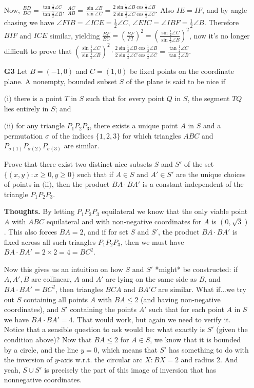 \documentclass[11pt,a4paper]{article}
\begin{document}
\begin{itemize}
Now, $\frac{BD}{DC}=\frac{\tan\frac12\angle C}{\tan\frac12\angle B}$,
$\frac{AC}{AB}=\frac{\sin\angle B}{\sin\angle C}=\frac{2\sin\frac 12\angle B\cos\frac 12\angle B}{2\sin\frac 12\angle C\cos\frac 12\angle C}$.
Also $IE=IF$, and by angle chasing we have $\angle FIB=\angle ICE=\frac12\angle C$,
$\angle EIC=\angle IBF=\frac12\angle B$.
Therefore $BIF$ and $ICE$ similar, yielding $\frac{BF}{EC}=\left(\frac{BF}{FI}\right)^2=\left(\frac{\sin\frac12\angle C}{\sin\frac12\angle B}\right)^2$,
now it's no longer difficult to prove that $\left(\frac{\sin\frac12\angle C}{\sin\frac12\angle B}\right)^2\cdot \frac{2\sin\frac 12\angle B\cos\frac 12\angle B}{2\sin\frac 12\angle C\cos\frac 12\angle C}=\frac{\tan\frac12\angle C}{\tan\frac12\angle B}$.

\newpage

\item[\textbf{G3}]
Let $B = (-1, 0)$ and $C = (1, 0)$ be fixed points on the coordinate plane. A nonempty, bounded subset $S$ of the plane is said to be nice if

$\text{(i)}$ there is a point $T$ in $S$ such that for every point $Q$ in $S$, the segment $TQ$ lies entirely in $S$; and

$\text{(ii)}$ for any triangle $P_1P_2P_3$, there exists a unique point $A$ in $S$ and a permutation $\sigma$ of the indices $\{1, 2, 3\}$ for which triangles $ABC$ and $P_{\sigma(1)}P_{\sigma(2)}P_{\sigma(3)}$ are similar.

Prove that there exist two distinct nice subsets $S$ and $S'$ of the set $\{(x, y) : x \geq 0, y \geq 0\}$ such that if $A \in S$ and $A' \in S'$ are the unique choices of points in $\text{(ii)}$, then the product $BA \cdot BA'$ is a constant independent of the triangle $P_1P_2P_3$.

\textbf{Thoughts.} 
By letting $P_1P_2P_3$ equilateral we know that the only viable point $A$ with $ABC$ equilateral and with non-negative coordinates for $A$ is $(0, \sqrt{3})$. This also forces $BA=2$, and if for set $S$ and $S'$, the product $BA\cdot BA'$ is fixed across all such triangles $P_1P_2P_3$, then we must have $BA\cdot BA'=2\times 2=4=BC^2$. 

Now this gives us an intuition on how $S$ and $S'$ *might* be constructed: if $A, A', B$ are collinear, $A$ and $A'$ are lying on the same side as $B$, and $BA\cdot BA'=BC^2$, then triangles $BCA$ and $BA'C$ are similar. What if...we try out $S$ containing all points $A$ with $BA\le 2$ (and having non-negative coordinates), and $S'$ containing the points $A'$ such that for each point $A$ in $S$ we have $BA\cdot BA'=4$. That would work, but again we need to verify it. Notice that a sensible question to ask would be: what exactly is $S'$ (given the condition above)? Now that $BA\le 2$ for $A\in S$, we know that it is bounded by a circle, and the line $y=0$, which means that $S'$ has something to do with the inversion of $y$-axis w.r.t. the circular arc $X: BX=2$ and radius 2. And yeah, $S\cup S'$ is precisely the part of this image of inversion that has nonnegative coordinates.


\end{itemize}
\end{document}
